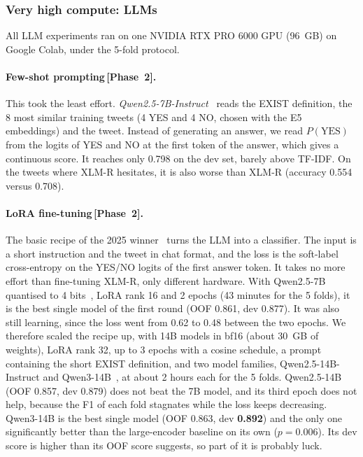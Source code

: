 \documentclass[pdflatex,sn-mathphys-num]{sn-jnl}
\newcommand{\Ptwo}{\,{\normalfont\textsf{\small[Phase~2]}}}
\begin{document}
\subsubsection{Very high compute: LLMs}

All LLM experiments ran on one NVIDIA RTX PRO 6000 GPU (96~GB) on Google Colab, under the 5-fold protocol.

\paragraph{Few-shot prompting\Ptwo.} This took the least effort. \emph{Qwen2.5-7B-Instruct}~\cite{qwen25} reads the EXIST definition, the 8 most similar training tweets (4 YES and 4 NO, chosen with the E5 embeddings) and the tweet. Instead of generating an answer, we read $P(\text{YES})$ from the logits of YES and NO at the first token of the answer, which gives a continuous score. It reaches only 0.798 on the dev set, barely above TF-IDF. On the tweets where XLM-R hesitates, it is also worse than XLM-R (accuracy 0.554 versus 0.708).

\paragraph{LoRA fine-tuning\Ptwo.} The basic recipe of the 2025 winner~\cite{mario2025} turns the LLM into a classifier. The input is a short instruction and the tweet in chat format, and the loss is the soft-label cross-entropy on the YES/NO logits of the first answer token. It takes no more effort than fine-tuning XLM-R, only different hardware. With Qwen2.5-7B quantised to 4 bits~\cite{dettmers2023qlora}, LoRA rank 16 and 2 epochs (43 minutes for the 5 folds), it is the best single model of the first round (OOF 0.861, dev 0.877). It was also still learning, since the loss went from 0.62 to 0.48 between the two epochs. We therefore scaled the recipe up, with 14B models in bf16 (about 30~GB of weights), LoRA rank 32, up to 3 epochs with a cosine schedule, a prompt containing the short EXIST definition, and two model families, Qwen2.5-14B-Instruct and Qwen3-14B~\cite{qwen3}, at about 2 hours each for the 5 folds. Qwen2.5-14B (OOF 0.857, dev 0.879) does not beat the 7B model, and its third epoch does not help, because the F1 of each fold stagnates while the loss keeps decreasing. Qwen3-14B is the best single model (OOF 0.863, dev \textbf{0.892}) and the only one significantly better than the large-encoder baseline on its own ($p = 0.006$). Its dev score is higher than its OOF score suggests, so part of it is probably luck.
\end{document}
